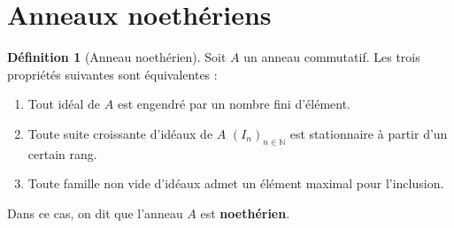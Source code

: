 \documentclass[french]{book}
\newcommand{\N}{\mathbb{N}}
\theoremstyle{plain}
\theoremstyle{definition}
\newtheorem{dfn}{Définition}[chapter]
\theoremstyle{remark}
\begin{document}
\section{Anneaux noethériens}
\begin{dfn}[Anneau noethérien]
	Soit $A$ un anneau commutatif. Les trois propriétés suivantes sont équivalentes : 
	\begin{enumerate}
		\item Tout idéal de $A$ est engendré par un nombre fini d'élément.
		\item Toute suite croissante d'idéaux de $A$ $(I_n)_{n\in\N}$ est stationnaire à partir d'un certain rang.
		\item Toute famille non vide d'idéaux admet un élément maximal pour l'inclusion.
	\end{enumerate}
	Dans ce cas, on dit que l'anneau $A$ est \textbf{noethérien}.
\end{dfn}
\end{document}
